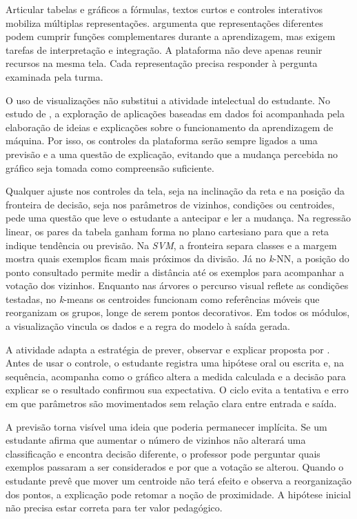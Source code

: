 Articular tabelas e gráficos a fórmulas, textos curtos e controles interativos mobiliza múltiplas representações.  argumenta que representações diferentes podem cumprir funções complementares durante a aprendizagem, mas exigem tarefas de interpretação e integração. A plataforma não deve apenas reunir recursos na mesma tela. Cada representação precisa responder à pergunta examinada pela turma.

O uso de visualizações não substitui a atividade intelectual do estudante. No estudo de , a exploração de aplicações baseadas em dados foi acompanhada pela elaboração de ideias e explicações sobre o funcionamento da aprendizagem de máquina. Por isso, os controles da plataforma serão sempre ligados a uma previsão e a uma questão de explicação, evitando que a mudança percebida no gráfico seja tomada como compreensão suficiente.

Qualquer ajuste nos controles da tela, seja na inclinação da reta e na posição da fronteira de decisão, seja nos parâmetros de vizinhos, condições ou centroides, pede uma questão que leve o estudante a antecipar e ler a mudança. Na regressão linear, os pares da tabela ganham forma no plano cartesiano para que a reta indique tendência ou previsão. Na \textit{SVM}, a fronteira separa classes e a margem mostra quais exemplos ficam mais próximos da divisão. Já no \textit{k}-NN, a posição do ponto consultado permite medir a distância até os exemplos para acompanhar a votação dos vizinhos. Enquanto nas árvores o percurso visual reflete as condições testadas, no \textit{k}-means os centroides funcionam como referências móveis que reorganizam os grupos, longe de serem pontos decorativos. Em todos os módulos, a visualização vincula os dados e a regra do modelo à saída gerada.

A atividade adapta a estratégia de prever, observar e explicar proposta por . Antes de usar o controle, o estudante registra uma hipótese oral ou escrita e, na sequência, acompanha como o gráfico altera a medida calculada e a decisão para explicar se o resultado confirmou sua expectativa. O ciclo evita a tentativa e erro em que parâmetros são movimentados sem relação clara entre entrada e saída.

A previsão torna visível uma ideia que poderia permanecer implícita. Se um estudante afirma que aumentar o número de vizinhos não alterará uma classificação e encontra decisão diferente, o professor pode perguntar quais exemplos passaram a ser considerados e por que a votação se alterou. Quando o estudante prevê que mover um centroide não terá efeito e observa a reorganização dos pontos, a explicação pode retomar a noção de proximidade. A hipótese inicial não precisa estar correta para ter valor pedagógico.

